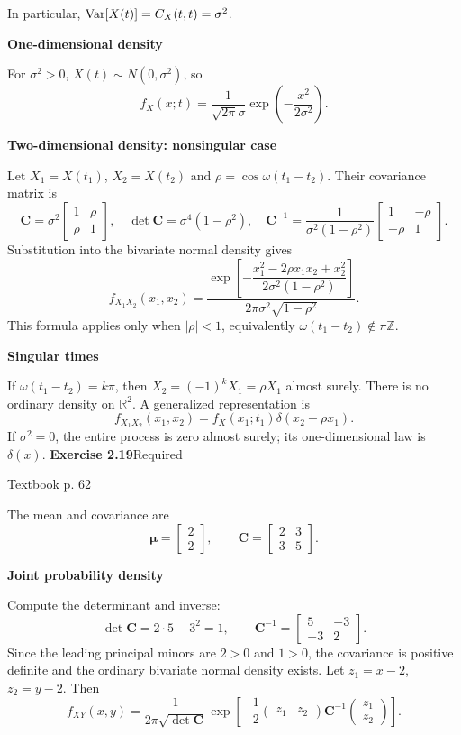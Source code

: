 \documentclass[a4paper,11pt]{article}
\newcommand{\problem}[3]{{\LARGE\bfseries Exercise #1}\hfill #2\par{\small\color{gray}Textbook p. #3}\par\vspace{3mm}}
\newcommand{\step}[1]{\par\textbf{#1}\par}
\begin{document}
In particular, $\operatorname{Var}[X(t)]=C_X(t,t)=\sigma^2$.
\step{One-dimensional density}
For $\sigma^2>0$, $X(t)\sim N(0,\sigma^2)$, so
\[
\boxed{f_X(x;t)=\frac1{\sqrt{2\pi}\sigma}\exp\left(-\frac{x^2}{2\sigma^2}\right).}
\]
\step{Two-dimensional density: nonsingular case}
Let $X_1=X(t_1)$, $X_2=X(t_2)$ and $\rho=\cos\omega(t_1-t_2)$. Their covariance matrix is
\[
\boldsymbol C=\sigma^2\begin{bmatrix}1&\rho\\\rho&1\end{bmatrix},\quad
\det\boldsymbol C=\sigma^4(1-\rho^2),\quad
\boldsymbol C^{-1}=\frac1{\sigma^2(1-\rho^2)}\begin{bmatrix}1&-\rho\\-\rho&1\end{bmatrix}.
\]
Substitution into the bivariate normal density gives
\[
\boxed{f_{X_1X_2}(x_1,x_2)=\frac{\exp\!\left[-\dfrac{x_1^2-2\rho x_1x_2+x_2^2}{2\sigma^2(1-\rho^2)}\right]}{2\pi\sigma^2\sqrt{1-\rho^2}}.}
\]
This formula applies only when $|\rho|<1$, equivalently $\omega(t_1-t_2)\notin\pi\mathbb Z$.
\step{Singular times}
If $\omega(t_1-t_2)=k\pi$, then $X_2=(-1)^kX_1=\rho X_1$ almost surely. There is no ordinary density on $\mathbb R^2$. A generalized representation is
\[
f_{X_1X_2}(x_1,x_2)=f_X(x_1;t_1)\delta(x_2-\rho x_1).
\]
If $\sigma^2=0$, the entire process is zero almost surely; its one-dimensional law is $\delta(x)$.
\newpage
\problem{2.19}{Required}{62}
The mean and covariance are
\[
\boldsymbol\mu=\begin{bmatrix}2\\2\end{bmatrix},\qquad
\boldsymbol C=\begin{bmatrix}2&3\\3&5\end{bmatrix}.
\]
\step{Joint probability density}
Compute the determinant and inverse:
\[
\det\boldsymbol C=2\cdot5-3^2=1,\qquad
\boldsymbol C^{-1}=\begin{bmatrix}5&-3\\-3&2\end{bmatrix}.
\]
Since the leading principal minors are $2>0$ and $1>0$, the covariance is positive definite and the ordinary bivariate normal density exists. Let $z_1=x-2$, $z_2=y-2$. Then
\[
f_{XY}(x,y)=\frac1{2\pi\sqrt{\det\boldsymbol C}}
\exp\left[-\frac12\begin{pmatrix}z_1&z_2\end{pmatrix}\boldsymbol C^{-1}\begin{pmatrix}z_1\\z_2\end{pmatrix}\right].
\]
\end{document}
